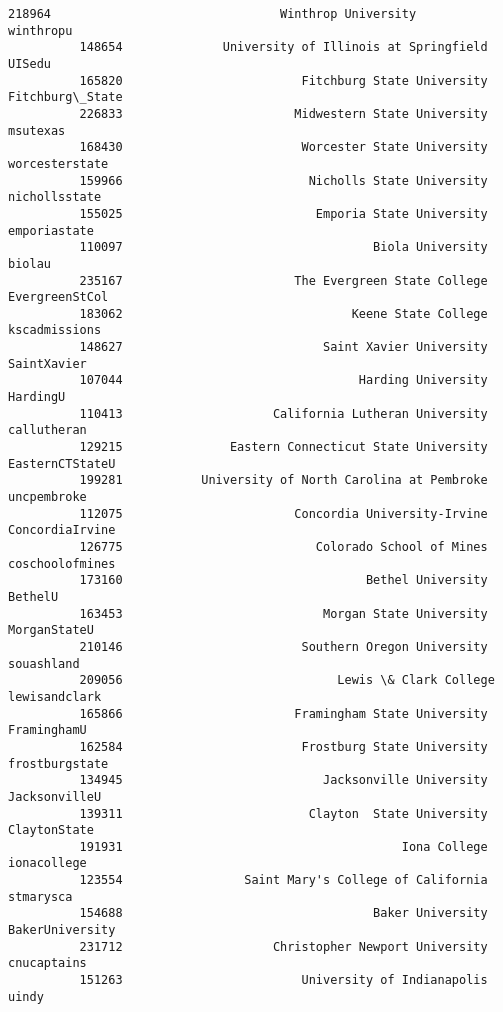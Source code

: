 \documentclass[11pt]{article}
\begin{document}
\begin{Verbatim}[commandchars=\\\{\}]
          218964                                Winthrop University        winthropu   
          148654              University of Illinois at Springfield           UISedu   
          165820                         Fitchburg State University  Fitchburg\_State   
          226833                        Midwestern State University         msutexas   
          168430                         Worcester State University   worcesterstate   
          159966                          Nicholls State University    nichollsstate   
          155025                           Emporia State University     emporiastate   
          110097                                   Biola University           biolau   
          235167                        The Evergreen State College   EvergreenStCol   
          183062                                Keene State College    kscadmissions   
          148627                            Saint Xavier University      SaintXavier   
          107044                                 Harding University         HardingU   
          110413                     California Lutheran University      callutheran   
          129215               Eastern Connecticut State University  EasternCTStateU   
          199281           University of North Carolina at Pembroke      uncpembroke   
          112075                        Concordia University-Irvine  ConcordiaIrvine   
          126775                           Colorado School of Mines  coschoolofmines   
          173160                                  Bethel University          BethelU   
          163453                            Morgan State University     MorganStateU   
          210146                         Southern Oregon University       souashland   
          209056                              Lewis \& Clark College    lewisandclark   
          165866                        Framingham State University      FraminghamU   
          162584                         Frostburg State University   frostburgstate   
          134945                            Jacksonville University    JacksonvilleU   
          139311                          Clayton  State University     ClaytonState   
          191931                                       Iona College      ionacollege   
          123554                 Saint Mary's College of California        stmarysca   
          154688                                   Baker University  BakerUniversity   
          231712                     Christopher Newport University      cnucaptains   
          151263                         University of Indianapolis            uindy   

\end{Verbatim}
\end{document}
